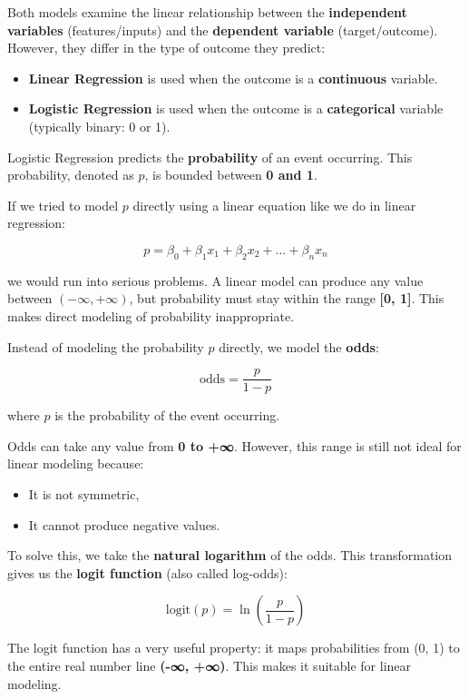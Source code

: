 \documentclass[
  letterpaper,
  DIV=11,
  numbers=noendperiod]{scrartcl}
\providecommand{\tightlist}{%
  \setlength{\itemsep}{0pt}\setlength{\parskip}{0pt}}
\begin{document}
Both models examine the linear relationship between the
\textbf{independent variables} (features/inputs) and the
\textbf{dependent variable} (target/outcome). However, they differ in
the type of outcome they predict:

\begin{itemize}
\tightlist
\item
  \textbf{Linear Regression} is used when the outcome is a
  \textbf{continuous} variable.
\item
  \textbf{Logistic Regression} is used when the outcome is a
  \textbf{categorical} variable (typically binary: 0 or 1).
\end{itemize}

Logistic Regression predicts the \textbf{probability} of an event
occurring. This probability, denoted as \(p\), is bounded between
\textbf{0 and 1}.

If we tried to model \(p\) directly using a linear equation like we do
in linear regression:

\[p = \beta_0 + \beta_1 x_1 + \beta_2 x_2 + \dots + \beta_n x_n\]

we would run into serious problems. A linear model can produce any value
between \((-\infty, +\infty)\), but probability must stay within the
range \textbf{{[}0, 1{]}}. This makes direct modeling of probability
inappropriate.

Instead of modeling the probability \(p\) directly, we model the
\textbf{odds}:

\[
\text{odds} = \frac{p}{1 - p}
\]

where \(p\) is the probability of the event occurring.

Odds can take any value from \textbf{0 to +∞}. However, this range is
still not ideal for linear modeling because:

\begin{itemize}
\tightlist
\item
  It is not symmetric,
\item
  It cannot produce negative values.
\end{itemize}

To solve this, we take the \textbf{natural logarithm} of the odds. This
transformation gives us the \textbf{logit function} (also called
log-odds):

\[
\text{logit}(p) = \ln\left(\frac{p}{1-p}\right)
\]

The logit function has a very useful property: it maps probabilities
from (0, 1) to the entire real number line \textbf{(-∞, +∞)}. This makes
it suitable for linear modeling.
\end{document}
